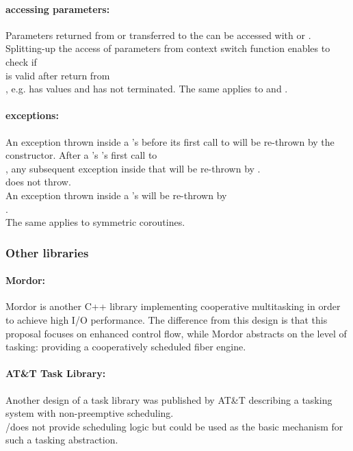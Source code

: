 \paragraph*{accessing parameters:}
Parameters returned from or transferred to the \corofunction can be accessed
with \pullcoroget or \yieldcoroget.\\
\newline
Splitting-up the access of parameters from context switch function enables to
check if\\
\pullcoro is valid after return from\\
\pullcoroop, e.g. \pullcoro has values and \corofunction has not terminated.
The same applies to \callcoro and \yieldcoro.

\paragraph*{exceptions:}
An exception thrown inside a \pullcoro's \corofunction before its first call to
\pushcoroop will be re-thrown by the \pullcoro constructor. After a \pullcoro's
\corofunction's first call to\\
\pushcoroop, any subsequent exception inside that \corofunction will be
re-thrown by \pullcoroop.\\
\pullcoroget does not throw.\\
\newline
An exception thrown inside a \pushcoro's \corofunction will be re-thrown by\\
\pushcoroop.\\
The same applies to symmetric coroutines.


\subsubsection*{Other libraries}
\paragraph*{Mordor:}
Mordor\cite{mordor} is another C++ library implementing cooperative multitasking
in order to achieve high I/O performance. The difference from this design is
that this proposal focuses on enhanced control flow, while Mordor\cite{mordor}
abstracts on the level of tasking: providing a cooperatively scheduled fiber
engine.

\paragraph*{AT\&T Task Library:}
Another design of a task library was published by AT\&T\cite{atnt1989}
describing a tasking system with non-preemptive scheduling.\\
\pushcoro/\pullcoro does not provide scheduling logic but could be used as the
basic mechanism for such a tasking abstraction.

